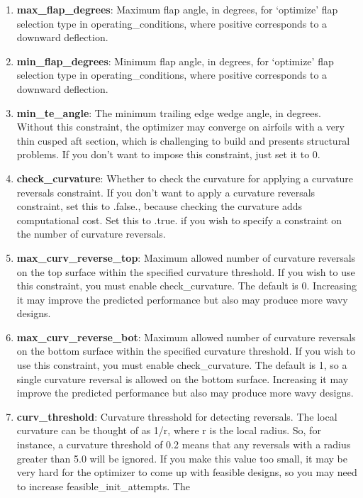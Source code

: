 \documentclass[11pt]{article}
\begin{document}
\begin{enumerate}
{negative pitching moment will require a larger tail.  For flying-wing airfoils, this is 
usually set to 0.  This input is only used if moment\_constraint\_type = `specify'.} 
\item{\textbf{max\_flap\_degrees}: Maximum flap angle, in degrees, for `optimize' flap 
selection type in operating\_conditions, where positive corresponds to a downward
deflection.}
\item{\textbf{min\_flap\_degrees}: Minimum flap angle, in degrees, for `optimize' flap 
selection type in operating\_conditions, where positive corresponds to a downward
deflection.}
\item{\textbf{min\_te\_angle}: The minimum trailing edge wedge angle, in degrees.  Without
this constraint, the optimizer may converge on airfoils with a very thin cusped aft
section, which is challenging to build and presents structural problems.  If you don't
want to impose this constraint, just set it to 0.}
\item{\textbf{check\_curvature}: Whether to check the curvature for applying a curvature
reversals constraint.  If you don't want to apply a curvature reversals constraint, set
this to .false., because checking the curvature adds computational cost.  Set this to
.true. if you wish to specify a constraint on the number of curvature reversals.}
\item{\textbf{max\_curv\_reverse\_top}: Maximum allowed number of curvature reversals on
the top surface within the specified curvature threshold.  If you wish to use this 
constraint, you must enable check\_curvature. The default is 0. Increasing it may improve
the predicted performance but also may produce more wavy designs.}
\item{\textbf{max\_curv\_reverse\_bot}: Maximum allowed number of curvature reversals on
the bottom surface within the specified curvature threshold.  If you wish to use this 
constraint, you must enable check\_curvature. The default is 1, so a single curvature
reversal is allowed on the bottom surface.  Increasing it may improve the predicted
performance but also may produce more wavy designs.}
\item{\textbf{curv\_threshold}: Curvature thresshold for detecting reversals.  The local
curvature can be thought of as 1/r, where r is the local radius.  So, for instance, a
curvature threshold of 0.2 means that any reversals with a radius greater than 5.0 will
be ignored.  If you make this value too small, it may be very hard for the optimizer to
come up with feasible designs, so you may need to increase feasible\_init\_attempts. The
}
\end{enumerate}
\end{document}
